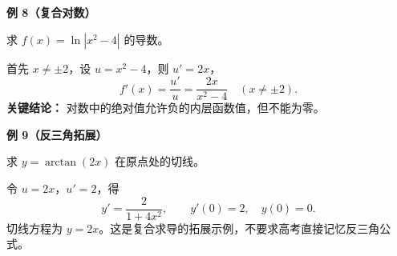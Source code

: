 \begin{examplebox}
\begin{minipage}{\linewidth}
\textbf{\textcolor{CExample}{例 8（复合对数）}}

求 $f(x)=\ln|x^2-4|$ 的导数。


\end{minipage}
首先 $x\ne\pm2$，设 $u=x^2-4$，则 $u'=2x$，
\[
f'(x)=\frac{u'}u=\frac{2x}{x^2-4}\quad(x\ne\pm2).
\]
\textbf{关键结论：} 对数中的绝对值允许负的内层函数值，但不能为零。

\medskip
\end{examplebox}

\begin{examplebox}
\begin{minipage}{\linewidth}
\textbf{\textcolor{CExample}{例 9（反三角拓展）}}

求 $y=\arctan(2x)$ 在原点处的切线。


\end{minipage}
令 $u=2x$，$u'=2$，得
\[
y'=\frac{2}{1+4x^2},\qquad y'(0)=2,\quad y(0)=0.
\]
切线方程为 $y=2x$。这是复合求导的拓展示例，不要求高考直接记忆反三角公式。
\end{examplebox}

